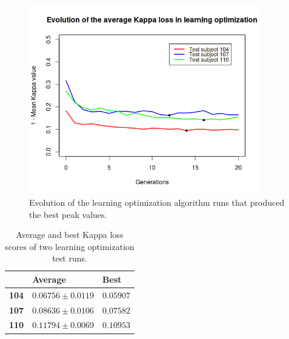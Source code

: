 	\begin{figure}[bth]

		\myfloatalign
		\includegraphics[width=0.9\textwidth]{gfx/LO_KappaEvolution.png}
		\caption[Evolution of the learning optimization algorithm]{Evolution of the learning optimization algorithm runs that produced the best peak values.}\label{gfx:learning_evolution}

	\end{figure}

	\begin{table}[h]

        \centering
        \setlength\arrayrulewidth{0.8pt}

        \begin{tabular}{| >{\centering\arraybackslash}m{0.7in} | >{\centering\arraybackslash}m{1.1in} | >{\centering\arraybackslash}m{1.1in} |}

			\hline
			\rowcolor{RoyalBlue}
			 & \textbf{Average} & \textbf{Best} \\
            \hline
            \cellcolor{RoyalBlue}\textbf{104} & $0.06756 \pm 0.0119$ & $0.05907$ \\
            \hline
            \cellcolor{RoyalBlue}\textbf{107} & $0.08636 \pm 0.0106$ & $0.07582$ \\
            \hline
            \cellcolor{RoyalBlue}\textbf{110} & $0.11794 \pm 0.0069$ & $0.10953$ \\
            \hline

        \end{tabular}

        \caption{Average and best Kappa loss scores of two learning optimization test runs.}\label{table:average_best_learning}

    \end{table}

